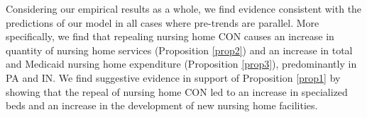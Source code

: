 \documentclass[../Main.tex]{subfiles}
\begin{document}
\indent Considering our empirical results as a whole, we find evidence consistent with the predictions of our model in all cases where pre-trends are parallel. More specifically, we find that repealing nursing home CON causes an increase in quantity of nursing home services (Proposition \ref{prop2}) and an increase in total and Medicaid nursing home expenditure (Proposition \ref{prop3}), predominantly in PA and IN. We find suggestive evidence in support of Proposition \ref{prop1} by showing that the repeal of nursing home CON led to an increase in specialized beds and an increase in the development of new nursing home facilities.
\end{document}
